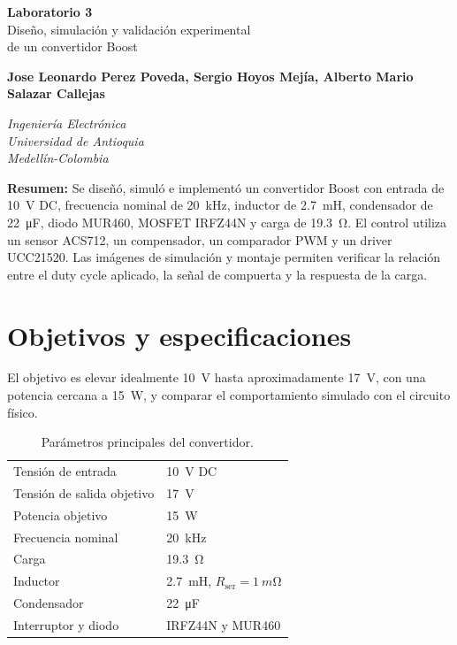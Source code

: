 \documentclass[12pt]{article}
\newcommand{\estudiantes}{Jose Leonardo Perez Poveda, Sergio Hoyos Mejía, Alberto Mario Salazar Callejas}
\begin{document}
\vspace*{-1cm}
\begin{center}
{\Huge
\textcolor{tituloazul}{
\textbf{Laboratorio 3}\\
Diseño, simulación y validación experimental\\
de un convertidor Boost
}}

\vspace{0.2cm}
{\textbf{\estudiantes}}

\vspace{0.2cm}
\textit{Ingeniería Electrónica}\\
\textit{Universidad de Antioquia}\\
\textit{Medellín-Colombia}
\end{center}

\vspace{0.3cm}

\noindent\textcolor{tituloazul}{\textbf{Resumen:}} Se diseñó, simuló e implementó un convertidor Boost con entrada de \SI{10}{V} DC, frecuencia nominal de \SI{20}{kHz}, inductor de \SI{2.7}{mH}, condensador de \SI{22}{\micro F}, diodo MUR460, MOSFET IRFZ44N y carga de \SI{19.3}{\ohm}. El control utiliza un sensor ACS712, un compensador, un comparador PWM y un driver UCC21520. Las imágenes de simulación y montaje permiten verificar la relación entre el duty cycle aplicado, la señal de compuerta y la respuesta de la carga.

\section{Objetivos y especificaciones}
El objetivo es elevar idealmente \SI{10}{V} hasta aproximadamente \SI{17}{V}, con una potencia cercana a \SI{15}{W}, y comparar el comportamiento simulado con el circuito físico.

\begin{table}[H]
\centering
\caption{Parámetros principales del convertidor.}
\begin{tabular}{ll}
\toprule
Tensión de entrada & \SI{10}{V} DC\\
Tensión de salida objetivo & \SI{17}{V}\\
Potencia objetivo & \SI{15}{W}\\
Frecuencia nominal & \SI{20}{kHz}\\
Carga & \SI{19.3}{\ohm}\\
Inductor & \SI{2.7}{mH}, $R_{\mathrm{ser}}=\SI{1}{m\ohm}$\\
Condensador & \SI{22}{\micro F}\\
Interruptor y diodo & IRFZ44N y MUR460\\
\bottomrule
\end{tabular}
\end{table}
\end{document}
